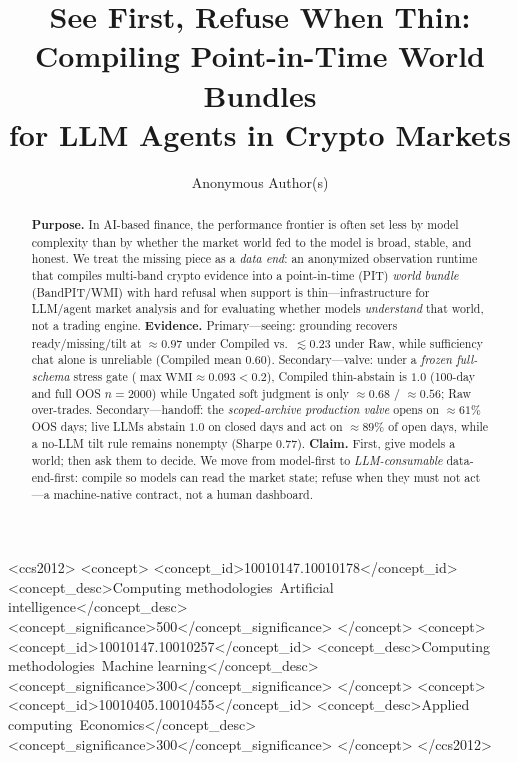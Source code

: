 \documentclass[sigconf,anonymous]{acmart}
\author{Anonymous Author(s)}
\affiliation{%
  \institution{Anonymous Institution}
  \country{}}
\theoremstyle{acmdefinition}%
\theoremstyle{acmplain}%
\begin{document}
\title[See First, Refuse When Thin]{%
  See First, Refuse When Thin:\\
  Compiling Point-in-Time World Bundles\\
  for LLM Agents in Crypto Markets}

\begin{abstract}
\textbf{Purpose.} In AI-based finance, the performance frontier is often set less by model complexity than by whether the market world fed to the model is broad, stable, and honest.
We treat the missing piece as a \emph{data end}: an anonymized observation runtime that compiles multi-band crypto evidence into a point-in-time (PIT) \emph{world bundle} (BandPIT/WMI) with hard refusal when support is thin---infrastructure for LLM/agent market analysis and for evaluating whether models \emph{understand} that world, not a trading engine.
\textbf{Evidence.} Primary---seeing: grounding recovers ready/missing/tilt at \({\approx}0.97\) under Compiled vs.\ \({\lesssim}0.23\) under Raw, while sufficiency chat alone is unreliable (Compiled mean \(0.60\)).
Secondary---valve: under a \emph{frozen full-schema} stress gate (\(\max\mathrm{WMI}\approx 0.093{<}0.2\)), Compiled thin-abstain is \(1.0\) (100-day and full OOS \(n{=}2000\)) while Ungated soft judgment is only \({\approx}0.68\) / \({\approx}0.56\); Raw over-trades.
Secondary---handoff: the \emph{scoped-archive production valve} opens on \({\approx}61\%\) OOS days; live LLMs abstain \(1.0\) on closed days and act on \({\approx}89\%\) of open days, while a no-LLM tilt rule remains nonempty (Sharpe \(0.77\)).
\textbf{Claim.} First, give models a world; then ask them to decide. We move from model-first to \emph{LLM-consumable} data-end-first: compile so models can read the market state; refuse when they must not act---a machine-native contract, not a human dashboard.
\end{abstract}

\begin{CCSXML}
<ccs2012>
 <concept>
  <concept_id>10010147.10010178</concept_id>
  <concept_desc>Computing methodologies~Artificial intelligence</concept_desc>
  <concept_significance>500</concept_significance>
 </concept>
 <concept>
  <concept_id>10010147.10010257</concept_id>
  <concept_desc>Computing methodologies~Machine learning</concept_desc>
  <concept_significance>300</concept_significance>
 </concept>
 <concept>
  <concept_id>10010405.10010455</concept_id>
  <concept_desc>Applied computing~Economics</concept_desc>
  <concept_significance>300</concept_significance>
 </concept>
</ccs2012>
\end{CCSXML}
\end{document}
